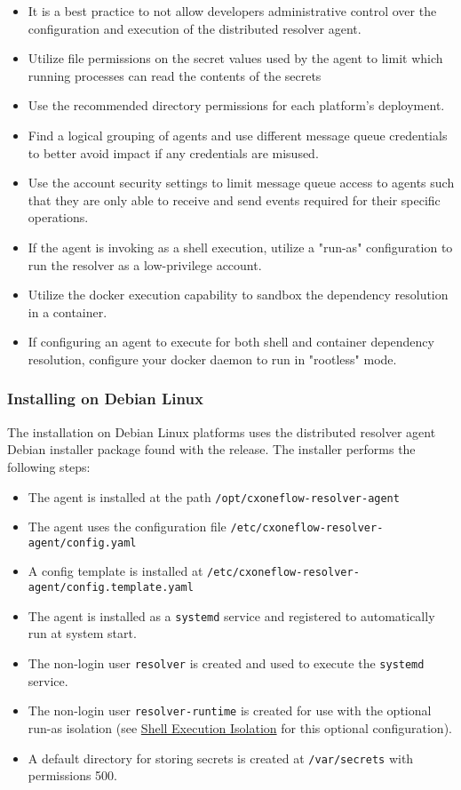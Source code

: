 \begin{itemize}
  \item It is a best practice to not allow developers administrative control over the configuration and
    execution of the distributed resolver agent.
  \item Utilize file permissions on the secret values used by the agent to limit which running processes
    can read the contents of the secrets
  \item Use the recommended directory permissions for each platform's deployment.
  \item Find a logical grouping of agents and use different message queue credentials to better avoid
    impact if any credentials are misused.
  \item Use the account security settings to limit message queue access to agents such that they are only
    able to receive and send events required for their specific operations.
  \item If the agent is invoking \scaresolver as a shell execution, utilize a "run-as" configuration to
    run the resolver as a low-privilege account.
  \item Utilize the \scaresolver docker execution capability to sandbox the dependency resolution in a container.
  \item If configuring an agent to execute \scaresolver for both shell and container dependency resolution,
    configure your docker daemon to run in "rootless" mode.
\end{itemize}



\subsubsection{Installing on Debian Linux}

The installation on Debian Linux platforms uses the distributed resolver agent Debian installer package
found with the \cxoneflow release.  The installer performs the following steps:

\begin{itemize}
  \item The agent is installed at the path \texttt{/opt/cxoneflow-resolver-agent}
  \item The agent uses the configuration file \texttt{/etc/cxoneflow-resolver-agent/config.yaml}
  \item A config template is installed at \texttt{/etc/cxoneflow-resolver-agent/config.template.yaml}
  \item The agent is installed as a \texttt{systemd} service and registered to automatically run at system start.
  \item The non-login user \texttt{resolver} is created and used to execute the \texttt{systemd} service.
  \item The non-login user \texttt{resolver-runtime} is created for use with the optional run-as isolation
    (see \hyperref[par:shell-agent-isolation]{Shell Execution Isolation} for this optional configuration).
  \item A default directory for storing secrets is created at \texttt{/var/secrets} with permissions 500.
\end{itemize}

